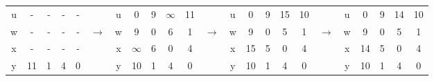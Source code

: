 \documentclass{article}
\begin{document}
\begin{latin}
\begin{table}[H]
\begin{tabular}{ccccccccccccccccccccccc}
\multicolumn{1}{|c|}{u}            & -                      & -                      & -                      & -                      & \multicolumn{1}{c|}{}                  & \multicolumn{1}{c|}{u}            & 0                      & 9                      & $\infty$               & 11                     & \multicolumn{1}{c|}{}                  & \multicolumn{1}{c|}{u}            & 0                      & 9                      & 15                     & 10                     & \multicolumn{1}{c|}{}                  & \multicolumn{1}{c|}{u}            & 0                      & 9                      & 14                     & 10                     \\ \cline{1-1} \cline{7-7} \cline{13-13} \cline{19-19}
\multicolumn{1}{|c|}{w}            & -                      & -                      & -                      & -                      & \multicolumn{1}{c|}{$\longrightarrow$} & \multicolumn{1}{c|}{w}            & 9                      & 0                      & 6                      & 1                      & \multicolumn{1}{c|}{$\longrightarrow$} & \multicolumn{1}{c|}{w}            & 9                      & 0                      & 5                      & 1                      & \multicolumn{1}{c|}{$\longrightarrow$} & \multicolumn{1}{c|}{w}            & 9                      & 0                      & 5                      & 1                      \\ \cline{1-1} \cline{7-7} \cline{13-13} \cline{19-19}
\multicolumn{1}{|c|}{x}            & -                      & -                      & -                      & -                      & \multicolumn{1}{c|}{}                  & \multicolumn{1}{c|}{x}            & $\infty$               & 6                      & 0                      & 4                      & \multicolumn{1}{c|}{}                  & \multicolumn{1}{c|}{x}            & 15                     & 5                      & 0                      & 4                      & \multicolumn{1}{c|}{}                  & \multicolumn{1}{c|}{x}            & 14                     & 5                      & 0                      & 4                      \\ \cline{1-1} \cline{7-7} \cline{13-13} \cline{19-19}
\multicolumn{1}{|c|}{y}            & 11                     & 1                      & 4                      & 0                      & \multicolumn{1}{c|}{}                  & \multicolumn{1}{c|}{y}            & 10                     & 1                      & 4                      & 0                      & \multicolumn{1}{c|}{}                  & \multicolumn{1}{c|}{y}            & 10                     & 1                      & 4                      & 0                      & \multicolumn{1}{c|}{}                  & \multicolumn{1}{c|}{y}            & 10                     & 1                      & 4                      & 0                      \\ \cline{1-1} \cline{7-7} \cline{13-13} \cline{19-19}
\end{tabular}
\end{table}


\end{latin}
\end{document}
